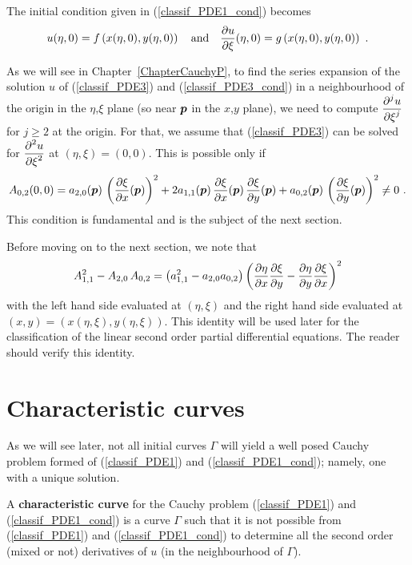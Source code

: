 The initial condition given in (\ref{classif_PDE1_cond}) becomes
\begin{equation} \label{classif_PDE3_cond}
u(\eta,0) = f\left(x(\eta,0),y(\eta,0)\right) \quad \text{and} \quad
\pdydx{u}{\xi}(\eta,0) = g\left(x(\eta,0),y(\eta,0)\right) \ .
\end{equation}

As we will see in Chapter~\ref{ChapterCauchyP}, to find the series
expansion of the solution $u$ of (\ref{classif_PDE3}) and
(\ref{classif_PDE3_cond}) in a neighbourhood of the origin in the
$\eta$,$\xi$ plane (so near ${\bm{p}}$ in the $x$,$y$ plane), we need to compute
$\displaystyle \frac{\displaystyle \partial^{j}{u}} {\displaystyle \partial \xi^{j}}$ for $j\geq 2$ at the origin.  For 
that, we assume that (\ref{classif_PDE3}) can be solved for
$\displaystyle \frac{\displaystyle \partial^{2}{u}} {\displaystyle \partial \xi^{2}}$ at $(\eta,\xi)=(0,0)$.  This is
possible only if
\begin{equation} \label{classif_PDE9}
A_{0,2}(0,0) = a_{2,0}({\bm{p}})\, \left(\frac{\partial{\xi}}{\partial x}({\bm{p}})\right)^2
+2a_{1,1}({\bm{p}})\,\frac{\partial{\xi}}{\partial x}({\bm{p}})\,\frac{\partial{\xi}}{\partial y}({\bm{p}})
+ a_{0,2}({\bm{p}})\, \left(\frac{\partial{\xi}}{\partial y}({\bm{p}})\right)^2
\neq 0 \ .
\end{equation}
This condition is fundamental and is the subject of the next section.

Before moving on to the next section, we note that
\begin{equation} \label{classif_PDE8}
A_{1,1}^2 - A_{2,0}\,A_{0,2} = \left(a_{1,1}^2 - a_{2,0}a_{0,2}\right)
\left( \frac{\partial{\eta}}{\partial x}\frac{\partial{\xi}}{\partial y} - \frac{\partial{\eta}}{\partial y}\frac{\partial{\xi}}{\partial x}
\right)^2
\end{equation}
with the left hand side evaluated at $(\eta,\xi)$ and the right hand
side evaluated at $(x,y) = \left(x(\eta,\xi),y(\eta,\xi)\right)$.
This identity will be used later for the classification of the linear second
order partial differential equations.  The reader should verify this identity.

\section{Characteristic curves}

As we will see later, not all initial curves $\Gamma$ will yield a
well posed Cauchy problem formed of (\ref{classif_PDE1}) and
(\ref{classif_PDE1_cond}); namely, one with a unique solution. 

\begin{defn}
A {\bfseries characteristic curve} for the
Cauchy problem (\ref{classif_PDE1}) and (\ref{classif_PDE1_cond}) is a
curve $\Gamma$ such that it is not possible from
(\ref{classif_PDE1}) and (\ref{classif_PDE1_cond}) to 
determine all the second order (mixed or not) derivatives of $u$ (in
the neighbourhood of $\Gamma$).
\end{defn}

